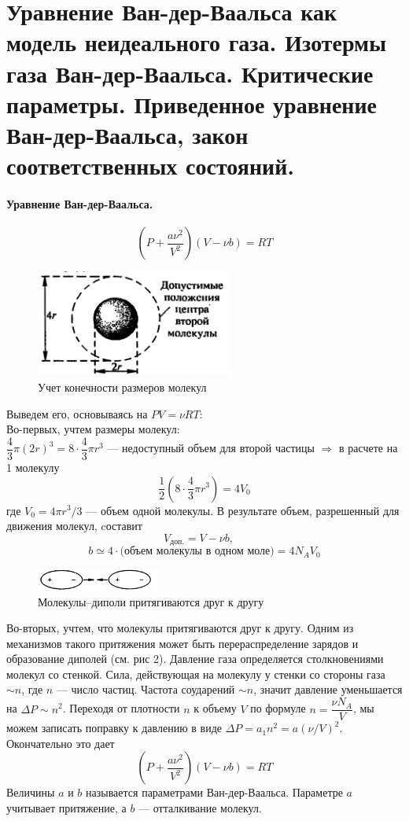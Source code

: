 \section{\normalsize Уравнение Ван-дер-Ваальса как модель неидеального газа. Изотермы газа Ван-дер-Ваальса. Критические параметры. Приведенное уравнение Ван-дер-Ваальса, закон соответственных состояний.}
\paragraph{Уравнение Ван-дер-Ваальса.}
$$\left(P+\dfrac{a\nu^2}{V^2}\right)\left(V-\nu b\right)=RT$$

\begin{figure}
	\includegraphics[width=65mm]{ris19.png}
	\caption{Учет конечности размеров молекул}
\end{figure}
Выведем его, основываясь на $PV=\nu RT$:\\
Во-первых, учтем размеры молекул: \\$\dfrac{4}{3}\pi(2r)^3=8\cdot\dfrac{4}{3}\pi r^3$ --- недоступный объем для второй частицы $\Rightarrow$ в расчете на 1 молекулу $$\dfrac{1}{2}(8\cdot\dfrac{4}{3}\pi r^3)=4V_0$$
где $V_0=4\pi r^3/3$ --- объем одной молекулы. 
В результате объем, разрешенный для движения молекул, cоставит
$$V_\text{доп.} =V-\nu b,\quad$$
$$ b\simeq4\cdot\text{(объем молекулы в одном моле)}=4N_AV_0$$

\begin{figure}
	\label{dipol}
	\includegraphics[width=40mm]{ris19_2.png}
	\caption{\small Молекулы--диполи притягиваются друг к другу}
\end{figure}
Во-вторых, учтем, что молекулы притягиваются друг к другу. Одним из механизмов такого притяжения может быть перераспределение зарядов и образование диполей (см. рис 2).
Давление газа определяется столкновениями молекул со стенкой. Сила, действующая на молекулу у стенки со стороны газа $\sim n$, где $n$ --- число частиц. Частота соударений $\sim n$, значит давление уменьшается на $\Delta P\sim n^2$. Переходя от плотности $n$ к объему $V$ по формуле $n=\dfrac{\nu N_A}{V}$, мы можем записать поправку к давлению в виде $\Delta P=a_1n^2=a(\nu/V)^2.$ Окончательно это дает
$$\left(P+\dfrac{a\nu^2}{V^2}\right)\left(V-\nu b\right)=RT$$
Величины $a$ и $b$ называется параметрами Ван-дер-Ваальса. Параметре $a$ учитывает притяжение, а $b$ --- отталкивание молекул.
